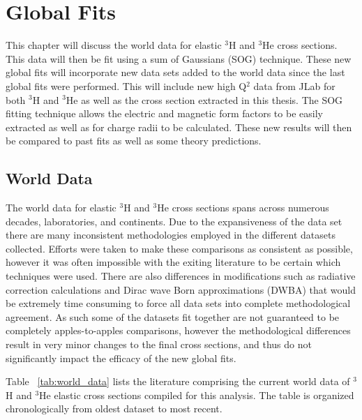 \chapter{Global Fits} %
\label{ch:global_fits} %

This chapter will discuss the world data for elastic $^3$H and $^3$He cross sections. This data will then be fit using a sum of Gaussians (SOG) technique. These new global fits will incorporate new data sets added to the world data since the last global fits were performed. This will include new high Q$^2$ data from JLab for both $^3$H and $^3$He as well as the cross section extracted in this thesis. The SOG fitting technique allows the electric and magnetic form factors to be easily extracted as well as for charge radii to be calculated. These new results will then be compared to past fits as well as some theory predictions.

\section{World Data}
\label{sec:world_data}

The world data for elastic $^3$H and $^3$He cross sections spans across numerous decades, laboratories, and continents. Due to the expansiveness of the data set there are many inconsistent methodologies employed in the different datasets collected. Efforts were taken to make these comparisons as consistent as possible, however it was often impossible with the exiting literature to be certain which techniques were used. There are also differences in modifications such as radiative correction calculations and Dirac wave Born approximations (DWBA) that would be extremely time consuming to force all data sets into complete methodological agreement. As such some of the datasets fit together are not guaranteed to be completely apples-to-apples comparisons, however the methodological differences result in very minor changes to the final cross sections, and thus do not significantly impact the efficacy of the new global fits.

Table ~\ref{tab:world_data} lists the literature comprising the current world data of $^3$H and $^3$He elastic cross sections compiled for this analysis. The table is organized chronologically from oldest dataset to most recent.
 

